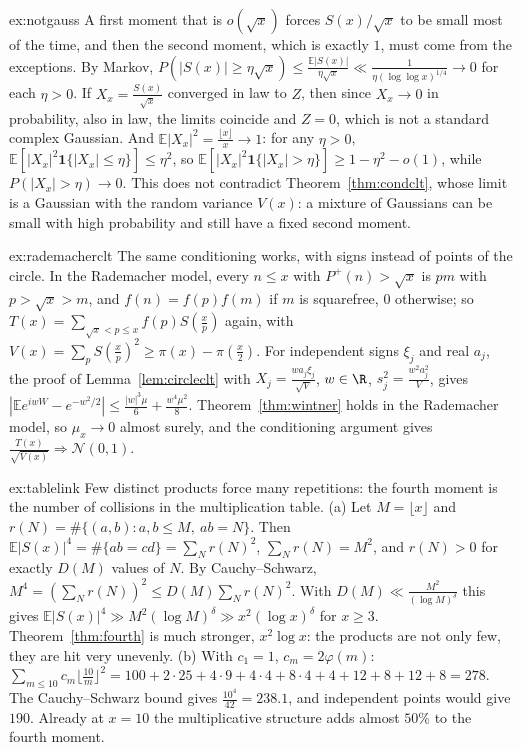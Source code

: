 \begin{solution}{ex:notgauss}
\idea A first moment that is $o(\sqrt x)$ forces $S(x)/\sqrt x$ to be small most of the time, and then the second moment, which is exactly $1$, must come from the exceptions.
\writeup By Markov, $P(|S(x)|\ge\eta\sqrt x)\le\frac{\mathbb E|S(x)|}{\eta\sqrt x}\ll\frac1{\eta(\log\log x)^{1/4}}\to0$ for each $\eta>0$. If $X_x=\frac{S(x)}{\sqrt x}$ converged in law to $Z$, then since $X_x\to0$ in probability, also in law, the limits coincide and $Z=0$, which is not a standard complex Gaussian. And $\mathbb E|X_x|^2=\frac{\lfloor x\rfloor}x\to1$: for any $\eta>0$, $\mathbb E[|X_x|^2\mathbf 1\{|X_x|\le\eta\}]\le\eta^2$, so $\mathbb E[|X_x|^2\mathbf 1\{|X_x|>\eta\}]\ge1-\eta^2-o(1)$, while $P(|X_x|>\eta)\to0$. This does not contradict Theorem~\ref{thm:condclt}, whose limit is a Gaussian with the random variance $V(x)$: a mixture of Gaussians can be small with high probability and still have a fixed second moment.
\end{solution}

\begin{solution}{ex:rademacherclt}
\idea The same conditioning works, with signs instead of points of the circle.
\writeup In the Rademacher model, every $n\le x$ with $P^+(n)>\sqrt x$ is $pm$ with $p>\sqrt x>m$, and $f(n)=f(p)f(m)$ if $m$ is squarefree, $0$ otherwise; so $T(x)=\sum_{\sqrt x<p\le x}f(p)S(\frac xp)$ again, with $V(x)=\sum_pS(\frac xp)^2\ge\pi(x)-\pi(\frac x2)$. For independent signs $\xi_j$ and real $a_j$, the proof of Lemma~\ref{lem:circleclt} with $X_j=\frac{wa_j\xi_j}{\sqrt V}$, $w\in\R$, $s_j^2=\frac{w^2a_j^2}V$, gives $|\mathbb Ee^{iwW}-e^{-w^2/2}|\le\frac{|w|^3\mu}6+\frac{w^4\mu^2}8$. Theorem~\ref{thm:wintner} holds in the Rademacher model, so $\mu_x\to0$ almost surely, and the conditioning argument gives $\frac{T(x)}{\sqrt{V(x)}}\Rightarrow\mathcal N(0,1)$.
\end{solution}

\begin{solution}{ex:tablelink}
\idea Few distinct products force many repetitions: the fourth moment is the number of collisions in the multiplication table.
\writeup (a) Let $M=\lfloor x\rfloor$ and $r(N)=\#\{(a,b):a,b\le M,\ ab=N\}$. Then $\mathbb E|S(x)|^4=\#\{ab=cd\}=\sum_Nr(N)^2$, $\sum_Nr(N)=M^2$, and $r(N)>0$ for exactly $D(M)$ values of $N$. By Cauchy--Schwarz, $M^4=(\sum_Nr(N))^2\le D(M)\sum_Nr(N)^2$. With $D(M)\ll\frac{M^2}{(\log M)^\delta}$ this gives $\mathbb E|S(x)|^4\gg M^2(\log M)^\delta\gg x^2(\log x)^\delta$ for $x\ge3$. Theorem~\ref{thm:fourth} is much stronger, $x^2\log x$: the products are not only few, they are hit very unevenly. (b) With $c_1=1$, $c_m=2\varphi(m)$: $\sum_{m\le10}c_m\lfloor\frac{10}m\rfloor^2=100+2\cdot25+4\cdot9+4\cdot4+8\cdot4+4+12+8+12+8=278$. The Cauchy--Schwarz bound gives $\frac{10^4}{42}=238.1$, and independent points would give $190$. Already at $x=10$ the multiplicative structure adds almost $50\%$ to the fourth moment.
\end{solution}

